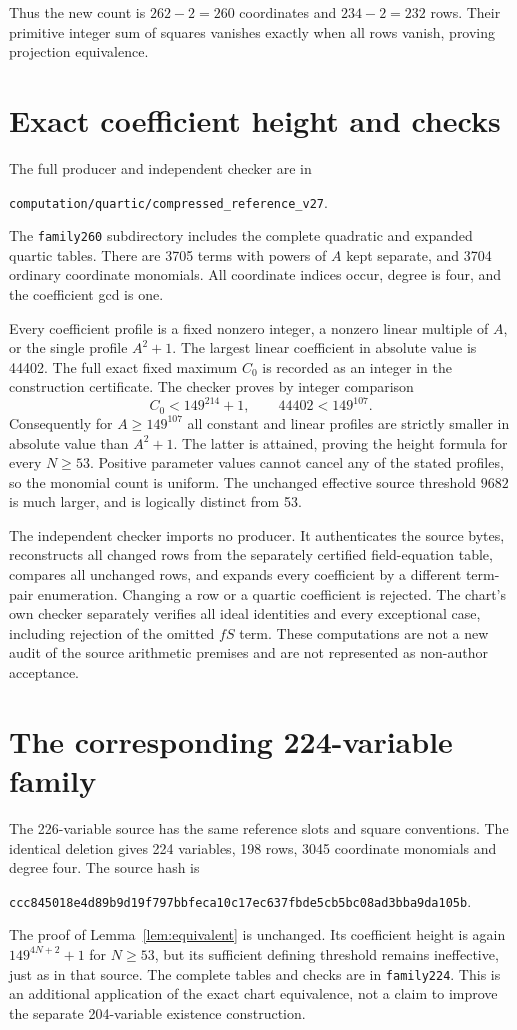\documentclass[11pt,a4paper]{article}
\begin{document}
Thus the new count is $262-2=260$ coordinates and $234-2=232$ rows.
Their primitive integer sum of squares vanishes exactly when all rows
vanish, proving projection equivalence.

\section{Exact coefficient height and checks}
The full producer and independent checker are in
\begin{center}\small
\nolinkurl{computation/quartic/compressed_reference_v27}.
\end{center}
The \texttt{family260} subdirectory includes the complete quadratic
and expanded quartic tables. There are 3705 terms with powers of $A$
kept separate, and 3704 ordinary coordinate monomials. All coordinate
indices occur, degree is four, and the coefficient gcd is one.

Every coefficient profile is a fixed nonzero integer, a nonzero linear
multiple of $A$, or the single profile $A^2+1$. The largest linear
coefficient in absolute value is 44402. The full exact fixed maximum
$C_0$ is recorded as an integer in the construction certificate.
The checker proves by integer comparison
\[
 C_0<149^{214}+1,\qquad44402<149^{107}.
\]
Consequently for $A\ge149^{107}$ all constant and linear profiles
are strictly smaller in absolute value than $A^2+1$. The latter is
attained, proving the height formula for every $N\ge53$.
Positive parameter values cannot cancel any of the stated profiles,
so the monomial count is uniform. The unchanged effective source
threshold $9682$ is much larger, and is logically distinct from 53.

The independent checker imports no producer. It authenticates the
source bytes, reconstructs all changed rows from the separately
certified field-equation table, compares all unchanged rows, and
expands every coefficient by a different term-pair enumeration.
Changing a row or a quartic coefficient is rejected. The chart's
own checker separately verifies all ideal identities and every
exceptional case, including rejection of the omitted $fS$ term.
These computations are not a new audit of the source arithmetic
premises and are not represented as non-author acceptance.

\section{The corresponding 224-variable family}
The 226-variable source has the same reference slots and square
conventions. The identical deletion gives 224 variables, 198 rows,
3045 coordinate monomials and degree four. The source hash is
\begin{center}\small
\texttt{ccc845018e4d89b9d19f797bbfeca10c17ec637fbde5cb5bc08ad3bba9da105b}.
\end{center}
The proof of Lemma~\ref{lem:equivalent} is unchanged. Its coefficient
height is again $149^{4N+2}+1$ for $N\ge53$, but its sufficient
defining threshold remains ineffective, just as in that source.
The complete tables and checks are in \texttt{family224}. This is an
additional application of the exact chart equivalence, not a claim to
improve the separate 204-variable existence construction.
\end{document}
